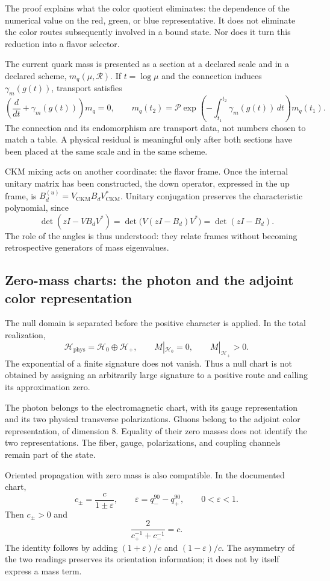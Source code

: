 The proof explains what the color quotient eliminates: the dependence of
the numerical value on the red, green, or blue representative. It does not eliminate the
color routes subsequently involved in a bound state. Nor does it
turn this reduction into a flavor selector.

The current quark mass is presented as a section at a declared scale and in a declared
scheme, \(m_q(\mu,\mathscr R)\). If \(t=\log\mu\) and the connection
induces \(\gamma_m(g(t))\), transport satisfies
\[
 \left(\frac{d}{dt}+\gamma_m(g(t))\right)m_q=0,
 \qquad
 m_q(t_2)=\mathcal P\exp\left(-\int_{t_1}^{t_2}
 \gamma_m(g(t))\,dt\right)m_q(t_1).
\]
The connection and its endomorphism are transport data, not numbers
chosen to match a table. A physical residual is meaningful only
after both sections have been placed at the same scale and in the same scheme.

CKM mixing acts on another coordinate: the flavor frame. Once
the internal unitary matrix has been constructed, the down operator, expressed
in the up frame, is \(B_d^{(u)}=V_{\mathrm{CKM}}B_dV_{\mathrm{CKM}}^*\).
Unitary conjugation preserves the characteristic polynomial, since
\[
 \det(zI-VB_dV^*)=\det\bigl(V(zI-B_d)V^*\bigr)=\det(zI-B_d).
\]
The role of the angles is thus understood: they relate frames without
becoming retrospective generators of mass eigenvalues.

\subsection{Zero-mass charts: the photon and the adjoint color representation}
\label{vi:subsec:nulo-familias}

The null domain is separated before the positive character is applied. In the
total realization,
\[
 \mathcal H_{\mathrm{phys}}=\mathcal H_0\oplus\mathcal H_+,
 \qquad M|_{\mathcal H_0}=0,\qquad M|_{\mathcal H_+}>0.
\]
The exponential of a finite signature does not vanish. Thus a null chart
is not obtained by assigning an arbitrarily large signature to a positive route
and calling its approximation zero.

The photon belongs to the electromagnetic chart, with its gauge
representation and its two physical transverse polarizations. Gluons
belong to the adjoint color representation, of dimension \(8\).
Equality of their zero masses does not identify the two representations.
The fiber, gauge, polarizations, and coupling channels
remain part of the state.

Oriented propagation with zero mass is also compatible. In the
documented chart,
\[
 c_\pm=\frac{c}{1\pm\varepsilon},\qquad
 \varepsilon=q_-^{90}-q_+^{90},\qquad0<\varepsilon<1.
\]
Then \(c_\pm>0\) and
\[
 \frac{2}{c_+^{-1}+c_-^{-1}}=c.
\]
The identity follows by adding \((1+\varepsilon)/c\) and
\((1-\varepsilon)/c\). The asymmetry of the two readings preserves its
orientation information; it does not by itself express a mass term.

